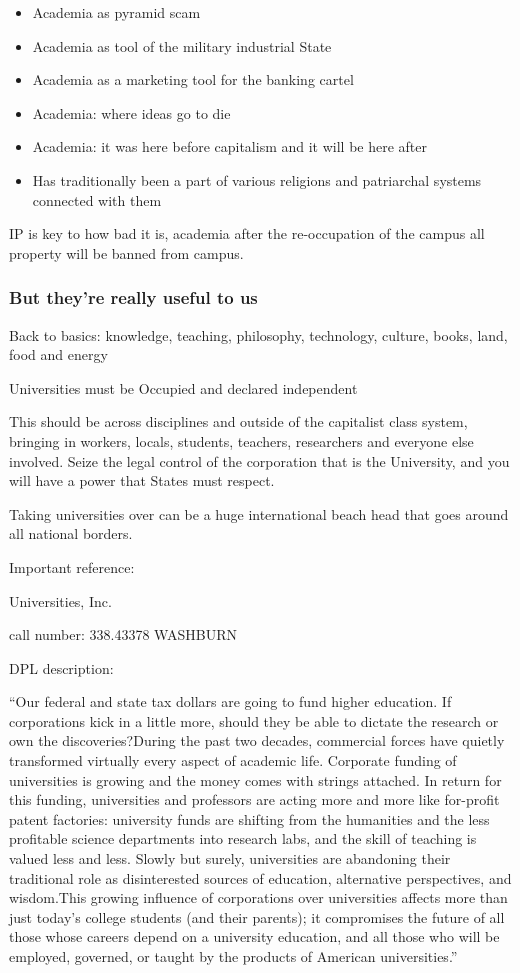 \begin{itemize}
\item
  Academia as pyramid scam
\item
  Academia as tool of the military industrial State
\item
  Academia as a marketing tool for the banking cartel
\item
  Academia: where ideas go to die
\item
  Academia: it was here before capitalism and it will be here after
\item
  Has traditionally been a part of various religions and patriarchal
  systems connected with them
\end{itemize}

IP is key to how bad it is, academia after the re-occupation of the
campus all property will be banned from campus.

\subsubsection{But they're really useful to
us}\label{but-theyre-really-useful-to-us}

Back to basics: knowledge, teaching, philosophy, technology, culture,
books, land, food and energy

Universities must be Occupied and declared independent

This should be across disciplines and outside of the capitalist class
system, bringing in workers, locals, students, teachers, researchers and
everyone else involved. Seize the legal control of the corporation that
is the University, and you will have a power that States must respect.

Taking universities over can be a huge international beach head that
goes around all national borders.

Important reference:

Universities, Inc.

call number: 338.43378 WASHBURN

DPL description:

``Our federal and state tax dollars are going to fund higher education.
If corporations kick in a little more, should they be able to dictate
the research or own the discoveries?During the past two decades,
commercial forces have quietly transformed virtually every aspect of
academic life. Corporate funding of universities is growing and the
money comes with strings attached. In return for this funding,
universities and professors are acting more and more like for-profit
patent factories: university funds are shifting from the humanities and
the less profitable science departments into research labs, and the
skill of teaching is valued less and less. Slowly but surely,
universities are abandoning their traditional role as disinterested
sources of education, alternative perspectives, and wisdom.This growing
influence of corporations over universities affects more than just
today's college students (and their parents); it compromises the future
of all those whose careers depend on a university education, and all
those who will be employed, governed, or taught by the products of
American universities.''
